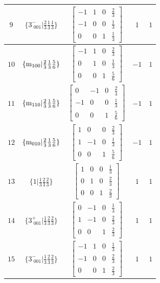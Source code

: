\documentclass[fleqn,8pt]{jsarticle}
\begin{document}
\begin{longtable}{ccccc}
$ 9 $ & $ \{3^{-}_{\,\,001}|\frac{2}{3} \frac{1}{3} \frac{1}{3}\} $ & $ \begin{bmatrix} -1 & 1 & 0 & \frac{2}{3} \\ -1 & 0 & 0 & \frac{1}{3} \\ 0 & 0 & 1 & \frac{1}{3} \end{bmatrix} $ & $ 1 $ & $ 1 $ \\ \hline
$ 10 $ & $ \{{\rm m}_{100}|\frac{2}{3} \frac{1}{3} \frac{5}{6}\} $ & $ \begin{bmatrix} -1 & 1 & 0 & \frac{2}{3} \\ 0 & 1 & 0 & \frac{1}{3} \\ 0 & 0 & 1 & \frac{5}{6} \end{bmatrix} $ & $ -1 $ & $ 1 $ \\ \hline
$ 11 $ & $ \{{\rm m}_{110}|\frac{2}{3} \frac{1}{3} \frac{5}{6}\} $ & $ \begin{bmatrix} 0 & -1 & 0 & \frac{2}{3} \\ -1 & 0 & 0 & \frac{1}{3} \\ 0 & 0 & 1 & \frac{5}{6} \end{bmatrix} $ & $ -1 $ & $ 1 $ \\ \hline
$ 12 $ & $ \{{\rm m}_{010}|\frac{2}{3} \frac{1}{3} \frac{5}{6}\} $ & $ \begin{bmatrix} 1 & 0 & 0 & \frac{2}{3} \\ 1 & -1 & 0 & \frac{1}{3} \\ 0 & 0 & 1 & \frac{5}{6} \end{bmatrix} $ & $ -1 $ & $ 1 $ \\ \hline
$ 13 $ & $ \{1|\frac{1}{3} \frac{2}{3} \frac{2}{3}\} $ & $ \begin{bmatrix} 1 & 0 & 0 & \frac{1}{3} \\ 0 & 1 & 0 & \frac{2}{3} \\ 0 & 0 & 1 & \frac{2}{3} \end{bmatrix} $ & $ 1 $ & $ 1 $ \\ \hline
$ 14 $ & $ \{3^{+}_{\,\,001}|\frac{1}{3} \frac{2}{3} \frac{2}{3}\} $ & $ \begin{bmatrix} 0 & -1 & 0 & \frac{1}{3} \\ 1 & -1 & 0 & \frac{2}{3} \\ 0 & 0 & 1 & \frac{2}{3} \end{bmatrix} $ & $ 1 $ & $ 1 $ \\ \hline
$ 15 $ & $ \{3^{-}_{\,\,001}|\frac{1}{3} \frac{2}{3} \frac{2}{3}\} $ & $ \begin{bmatrix} -1 & 1 & 0 & \frac{1}{3} \\ -1 & 0 & 0 & \frac{2}{3} \\ 0 & 0 & 1 & \frac{2}{3} \end{bmatrix} $ & $ 1 $ & $ 1 $ \\ \hline

\end{longtable}
\end{document}
